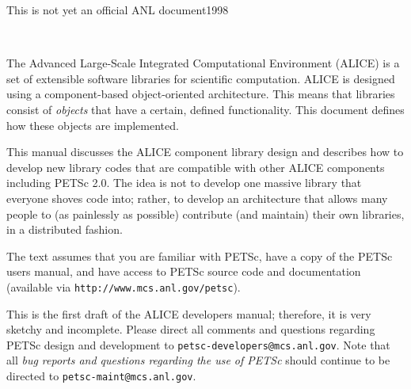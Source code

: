 \documentclass[twoside,12pt]{../sty/report_petsc}
\begin{document}
{\Large This is not yet an official ANL document}{1998}

\newpage

\hbox{ }

\vspace{1in}
\date{\today}

\newpage



\medskip \medskip


%
%

\medskip \medskip
The Advanced Large-Scale Integrated Computational Environment (ALICE) is 
a set of extensible software libraries for scientific computation.
ALICE is designed using a component-based object-oriented
architecture. This means that libraries consist of {\em objects} that
have a certain, defined functionality. This document defines how these
objects are implemented.

This manual discusses the ALICE component library design and describes
how to develop new library codes that are compatible with other ALICE components 
including PETSc 2.0.
The idea is not to develop one massive library that everyone shoves code 
into; rather, to develop an architecture that allows many people
to (as painlessly as possible) contribute (and maintain) their own libraries,
in a distributed fashion.

The text assumes
that you are familiar with PETSc, have a copy of the PETSc users
manual, and have access to PETSc source code and documentation
(available via {\tt http://www.mcs.anl.gov/petsc}).


\vspace{1cm}

This is the first draft of the ALICE developers manual;
therefore, it is very sketchy and incomplete. Please
direct all comments and questions regarding PETSc design and
development to {\tt petsc-developers@mcs.anl.gov}.  Note that all {\em
bug reports and questions regarding the use of PETSc} should continue
to be directed to {\tt petsc-maint@mcs.anl.gov}.
\end{document}
